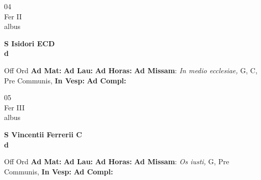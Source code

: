\documentclass[10pt, openany]{book}
\begin{document}
        \begin{center}
            \begin{minipage}{3.5in}
                \vspace{2em}
                \begin{minipage}{0.5in}
                    {\Huge 04} \\
                    {\normalsize Fer II} \\
                    {\normalsize albus}
                \end{minipage}
                \begin{minipage}{3.0in}
                    \textbf{ \large S Isidori ECD \\
                    \textnormal{\normalsize d}} \\ 
                \end{minipage}
                \begin{justify}Off Ord
                    \textbf{Ad Mat: }
                    \textbf{Ad Lau: }
                    \textbf{Ad Horas: }\textbf{Ad Missam}: \textit{In medio ecclesiae,} G, C, Pre Communis,  
                    \textbf{In Vesp: }
                    \textbf{Ad Compl: }
                \end{justify}
            \end{minipage}
        \end{center}
    
        \begin{center}
            \begin{minipage}{3.5in}
                \vspace{2em}
                \begin{minipage}{0.5in}
                    {\Huge 05} \\
                    {\normalsize Fer III} \\
                    {\normalsize albus}
                \end{minipage}
                \begin{minipage}{3.0in}
                    \textbf{ \large S Vincentii Ferrerii C \\
                    \textnormal{\normalsize d}} \\ 
                \end{minipage}
                \begin{justify}Off Ord
                    \textbf{Ad Mat: }
                    \textbf{Ad Lau: }
                    \textbf{Ad Horas: }\textbf{Ad Missam}: \textit{Os iusti,} G, Pre Communis,  
                    \textbf{In Vesp: }
                    \textbf{Ad Compl: }
                \end{justify}
            \end{minipage}
        \end{center}
    
\end{document}
